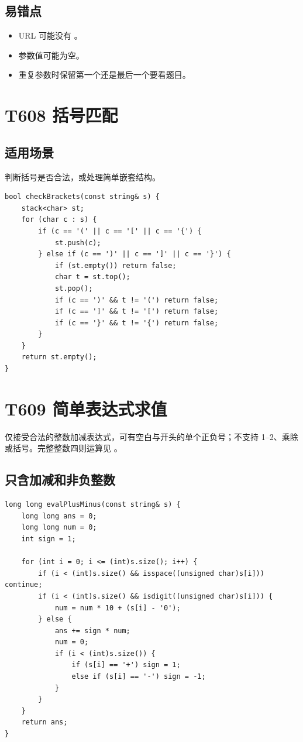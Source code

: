 \subsection{易错点}

\begin{itemize}
  \item URL 可能没有 。
  \item 参数值可能为空。
  \item 重复参数时保留第一个还是最后一个要看题目。
\end{itemize}

\section{T608 括号匹配}\label{sec:09-48}\label{tpl:608}

\subsection{适用场景}

判断括号是否合法，或处理简单嵌套结构。

\begin{lstlisting}
bool checkBrackets(const string& s) {
    stack<char> st;
    for (char c : s) {
        if (c == '(' || c == '[' || c == '{') {
            st.push(c);
        } else if (c == ')' || c == ']' || c == '}') {
            if (st.empty()) return false;
            char t = st.top();
            st.pop();
            if (c == ')' && t != '(') return false;
            if (c == ']' && t != '[') return false;
            if (c == '}' && t != '{') return false;
        }
    }
    return st.empty();
}
\end{lstlisting}

\section{T609 简单表达式求值}\label{sec:09-49}\label{tpl:609}

仅接受合法的整数加减表达式，可有空白与开头的单个正负号；不支持 1--2、乘除或括号。完整整数四则运算见 。

\subsection{只含加减和非负整数}

\begin{lstlisting}
long long evalPlusMinus(const string& s) {
    long long ans = 0;
    long long num = 0;
    int sign = 1;

    for (int i = 0; i <= (int)s.size(); i++) {
        if (i < (int)s.size() && isspace((unsigned char)s[i])) continue;
        if (i < (int)s.size() && isdigit((unsigned char)s[i])) {
            num = num * 10 + (s[i] - '0');
        } else {
            ans += sign * num;
            num = 0;
            if (i < (int)s.size()) {
                if (s[i] == '+') sign = 1;
                else if (s[i] == '-') sign = -1;
            }
        }
    }
    return ans;
}
\end{lstlisting}

